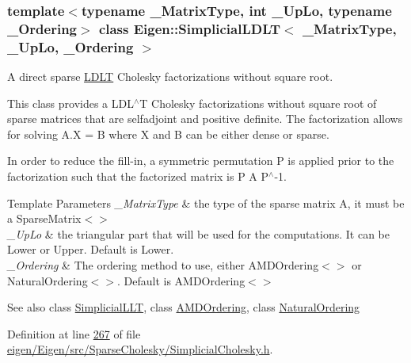 \subsubsection*{template$<$typename \+\_\+\+Matrix\+Type, int \+\_\+\+Up\+Lo, typename \+\_\+\+Ordering$>$\newline
class Eigen\+::\+Simplicial\+L\+D\+L\+T$<$ \+\_\+\+Matrix\+Type, \+\_\+\+Up\+Lo, \+\_\+\+Ordering $>$}

A direct sparse \hyperlink{group___cholesky___module_class_eigen_1_1_l_d_l_t}{L\+D\+LT} Cholesky factorizations without square root. 

This class provides a L\+D\+L$^\wedge$T Cholesky factorizations without square root of sparse matrices that are selfadjoint and positive definite. The factorization allows for solving A.\+X = B where X and B can be either dense or sparse.

In order to reduce the fill-\/in, a symmetric permutation P is applied prior to the factorization such that the factorized matrix is P A P$^\wedge$-\/1.


\begin{DoxyTemplParams}{Template Parameters}
{\em \+\_\+\+Matrix\+Type} & the type of the sparse matrix A, it must be a Sparse\+Matrix$<$$>$ \\
\hline
{\em \+\_\+\+Up\+Lo} & the triangular part that will be used for the computations. It can be Lower or Upper. Default is Lower. \\
\hline
{\em \+\_\+\+Ordering} & The ordering method to use, either A\+M\+D\+Ordering$<$$>$ or Natural\+Ordering$<$$>$. Default is A\+M\+D\+Ordering$<$$>$\\
\hline
\end{DoxyTemplParams}


\begin{DoxySeeAlso}{See also}
class \hyperlink{group___sparse_cholesky___module_class_eigen_1_1_simplicial_l_l_t}{Simplicial\+L\+LT}, class \hyperlink{group___ordering_methods___module_class_eigen_1_1_a_m_d_ordering}{A\+M\+D\+Ordering}, class \hyperlink{group___ordering_methods___module_class_eigen_1_1_natural_ordering}{Natural\+Ordering} 
\end{DoxySeeAlso}


Definition at line \hyperlink{eigen_2_eigen_2src_2_sparse_cholesky_2_simplicial_cholesky_8h_source_l00267}{267} of file \hyperlink{eigen_2_eigen_2src_2_sparse_cholesky_2_simplicial_cholesky_8h_source}{eigen/\+Eigen/src/\+Sparse\+Cholesky/\+Simplicial\+Cholesky.\+h}.

